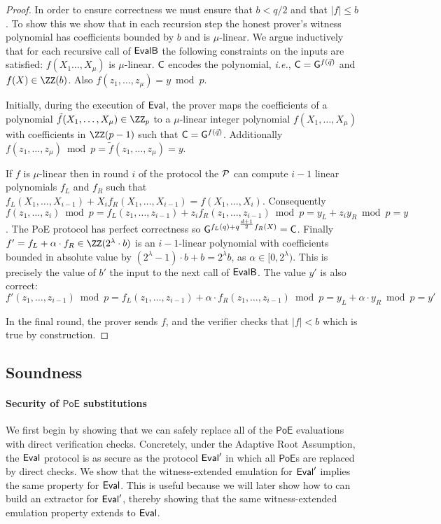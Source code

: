 \begin{proof}
In order to ensure correctness we must ensure that $b< q/2$ and that $|f|\leq b$. To show this we show that in each recursion step the honest prover's witness polynomial has coefficients bounded by $b$ and is $\mu$-linear. 
We argue inductively that for each recursive call of $\textsf{{EvalB}}$ the following constraints on the inputs are satisfied: $f(X_1\dots,X_\mu)$ is $\mu$-linear. $\gr{C}$ encodes the polynomial, \emph{i.e.}, $\gr{C}=\gr{g}^{f(\vec{q})}$ and $f(X)\in \ZZ(b)$. Also $f(z_1,\dots,z_\mu) = y\bmod p$.

Initially, during the execution of $\textsf{{Eval}}$, the prover maps the coefficients of a polynomial $\tilde{f}(X_1,\dots,X_\mu)\in \ZZ_p$ to a $\mu$-linear integer polynomial $f(X_1,\dots,X_\mu)$ with coefficients in $\ZZ(p-1)$  such that $\gr{C}=\gr{g}^{f(\vec{q})}$. Additionally $f(z_1,\dots,z_\mu)\bmod p=\tilde{f}(z_1, \dots,z_\mu)=y$.

 
If $f$ is $\mu$-linear then in round $i$ of the protocol the $\mathcal{P}$ can compute $i-1$ linear polynomials $f_L$ and $f_R$ such that $f_L(X_1,\dots,X_{i-1})+X_i f_R(X_1,\dots,X_{i-1})=f(X_1,\dots,X_i)$. Consequently $f(z_1,\dots,z_{i}) \bmod p=f_L(z_1,\dots,z_{i-1})+ z_i f_R(z_1,\dots,z_{i-1})\bmod p=y_L+z_i  y_R\bmod p =y$. The \textsf{PoE} protocol has perfect correctness so {$\gr{g}^{f_L(q)+q^{\frac{d+1}{2}} f_R(X)}=\gr{C}$}.
 Finally $f'= f_L +\alpha\cdot  f_R \in \ZZ(2^{\lambda} \cdot b)$ is an $i-1$-linear polynomial with coefficients bounded in absolute value by $(2^\lambda-1) \cdot b+b=2^{\lambda} b$, as $\alpha\in [0,2^\lambda)$. This is precisely the value of $b'$ the input to the next call of $\textsf{{EvalB}}$. The value $y'$ is also correct:
$f'(z_1,\dots,z_{i-1})\bmod p=f_L(z_1,\dots,z_{i-1}) +\alpha  \cdot f_R(z_1,\dots,z_{i-1}) \bmod p= y_L +\alpha  \cdot y_R\bmod p=y'$
 
 In the final round, the prover sends $f$, and the verifier checks that $|f|<b$ which is true by construction.
\end{proof} 

\subsection{Soundness}
\label{sec:darksoundness}
\paragraph{Security of $\textsf{PoE}$ substitutions}
We first begin by showing that we can safely replace all of the $\textsf{PoE}$ evaluations with direct verification checks. Concretely, under the Adaptive Root Assumption, the $\textsf{{Eval}}$ protocol is as secure as the protocol $\textsf{{Eval}}'$ in which all $\textsf{PoE}$s are replaced by direct checks. We show that the witness-extended emulation for $\textsf{{Eval}}'$ implies the same property for $\textsf{{Eval}}$. This is useful because we will later show how to can build an extractor for $\textsf{{Eval}}'$, thereby showing that the same witness-extended emulation property extends to $\textsf{{Eval}}$.

